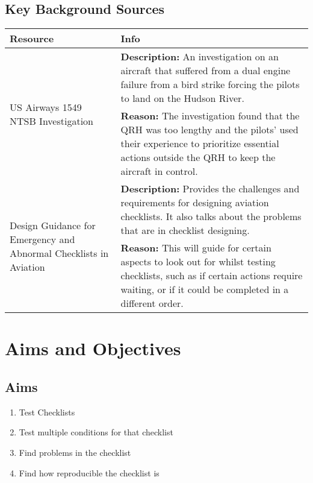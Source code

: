 \documentclass[a4paper]{article}
\begin{document}
\subsection{Key Background Sources}
\begin{tabularx}{\linewidth}{p{8em} X}
    \toprule
    Resource & Info \\
    \midrule
    \multirow{2}{*}{\parbox{8em}{US Airways 1549 NTSB Investigation~\cite{AWE1549}}}
    & \textbf{Description:} An investigation on an aircraft that
        suffered from a dual engine failure from a bird strike
        forcing the pilots to land on the Hudson River. \\
    & \textbf{Reason:} The investigation found that the QRH was too
        lengthy and the pilots' used their experience to prioritize
        essential actions outside the QRH to keep the aircraft in control. \\

    \multirow{2}{*}{\parbox{8em}{Design Guidance for Emergency and Abnormal Checklists in Aviation~\cite{nasa}}}
    & \textbf{Description:} Provides the challenges and
      requirements for designing aviation checklists.
      It also talks about the problems that are in 
      checklist designing. \\
    & \textbf{Reason:} This will guide for certain aspects to
      look out for whilst testing checklists, such as if
      certain actions require waiting, or if it could be
      completed in a different order. \\
    \bottomrule
\end{tabularx}

\section{Aims and Objectives}
\subsection*{Aims}
\begin{enumerate}
    \item Test Checklists
    \item Test multiple conditions for that checklist
    \item Find problems in the checklist
    \item Find how reproducible the checklist is
\end{enumerate}
\end{document}
